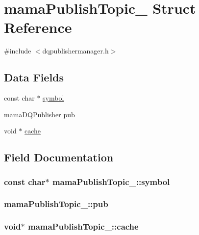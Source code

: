 \hypertarget{structmamaPublishTopic__}{
\section{mamaPublishTopic\_\- Struct Reference}
\label{structmamaPublishTopic__}
}


{\ttfamily \#include $<$dqpublishermanager.h$>$}\subsection*{Data Fields}
\begin{DoxyCompactItemize}
\item 
const char $\ast$ \hyperlink{structmamaPublishTopic___a37f45bbf9bee20e6a20603ecb8823de0}{symbol}
\item 
\hyperlink{types_8h_a4f55f117db650ba4b823e1176b6cfc59}{mamaDQPublisher} \hyperlink{structmamaPublishTopic___a1379fefa657807131da230031f679db8}{pub}
\item 
void $\ast$ \hyperlink{structmamaPublishTopic___ad83ac027ceaef06c8a7daa8c91d6533d}{cache}
\end{DoxyCompactItemize}


\subsection{Field Documentation}
\hypertarget{structmamaPublishTopic___a37f45bbf9bee20e6a20603ecb8823de0}{
\subsubsection[{symbol}]{\setlength{\rightskip}{0pt plus 5cm}const char$\ast$ {\bf mamaPublishTopic\_\-::symbol}}}
\label{structmamaPublishTopic___a37f45bbf9bee20e6a20603ecb8823de0}
\hypertarget{structmamaPublishTopic___a1379fefa657807131da230031f679db8}{
\subsubsection[{pub}]{ {\bf mamaPublishTopic\_\-::pub}}}
\label{structmamaPublishTopic___a1379fefa657807131da230031f679db8}
\hypertarget{structmamaPublishTopic___ad83ac027ceaef06c8a7daa8c91d6533d}{
\subsubsection[{cache}]{\setlength{\rightskip}{0pt plus 5cm}void$\ast$ {\bf mamaPublishTopic\_\-::cache}}}
\label{structmamaPublishTopic___ad83ac027ceaef06c8a7daa8c91d6533d}
